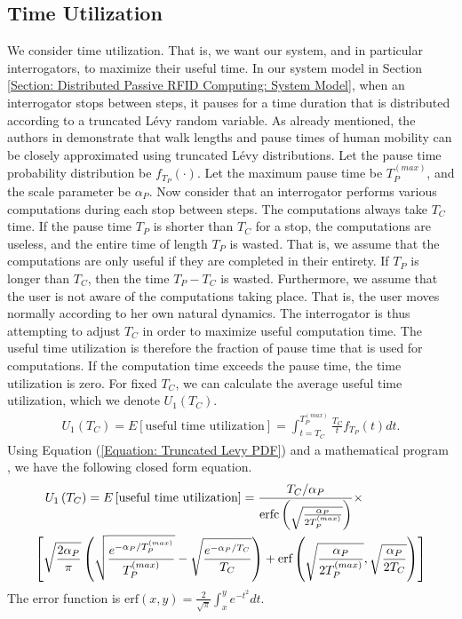 \subsection{Time Utilization}
\label{Section: Distributed Passive RFID Computing: Simulations: Time Utilization}
We consider time utilization. That is, we want our system, and in particular interrogators, to maximize their useful time. In our system model in Section \ref{Section: Distributed Passive RFID Computing: System Model}, when an interrogator stops between steps, it pauses for a time duration that is distributed according to a truncated L\'{e}vy random variable. As already mentioned, the authors in \cite{2008 Rhee} demonstrate that walk lengths and pause times of human mobility can be closely approximated using truncated L\'{e}vy distributions. Let the pause time probability distribution be $f_{T_P}\left(\cdot\right)$. Let the maximum pause time be $T_P^{(max)}$, and the scale parameter be $\alpha_P$. Now consider that an interrogator performs various computations during each stop between steps. The computations always take $T_C$ time. If the pause time $T_P$ is shorter than $T_C$ for a stop, the computations are useless, and the entire time of length $T_P$ is wasted. That is, we assume that the computations are only useful if they are completed in their entirety. If $T_P$ is longer than $T_C$, then the time $T_P - T_C$ is wasted. Furthermore, we assume that the user is not aware of the computations taking place. That is, the user moves normally according to her own natural dynamics. The interrogator is thus attempting to adjust $T_C$ in order to maximize useful computation time. The useful time utilization is therefore the fraction of pause time that is used for computations. If the computation time exceeds the pause time, the time utilization is zero. For fixed $T_C$, we can calculate the average useful time utilization, which we denote $U_1\left(T_C\right)$.
\begin{eqnarray}
U_1\left(T_C\right) = E \left[\mbox{useful time utilization}\right] = \int_{t = T_C}^{T_P^{(max)}} \frac{T_C}{t} f_{T_P}\left(t\right) dt.
\end{eqnarray}
Using Equation (\ref{Equation: Truncated Levy PDF}) and a mathematical program \cite{WolframAlpha}, we have the following closed form equation.
\begin{eqnarray}
U_1\left(T_C\right) = E \left[\mbox{useful time utilization}\right] =
\frac{T_C / \alpha_P}{\mbox{erfc}\left(\sqrt{\frac{\alpha_P}{2 T_P^{(max)}}}\right)} \times \hspace{0.7in} \nonumber \\
\left[ 
\sqrt{\frac{2\alpha_P}{\pi }} \left( \sqrt{\frac{e^{-\alpha_P/T_P^{(max)}}}{T_P^{(max)}}} - \sqrt{\frac{e^{-\alpha_P/T_C}}{T_C}}\right) + 
 \mbox{erf} \left( \sqrt{\frac{\alpha_P}{2T_P^{(max)}}}, \sqrt{\frac{\alpha_P}{2T_C}} \right)
\right]
\label{Equation: Average Useful Time Utilization}
\end{eqnarray}
The error function is $\mbox{erf}\left(x, y\right) = \frac{2}{\sqrt{\pi}} \int_x^{y}e^{-t^2}dt$. 

